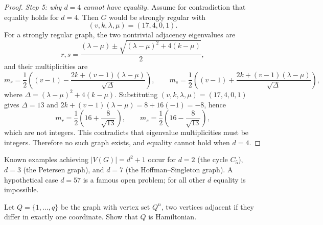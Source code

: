 \documentclass[11pt, a4paper]{ctexrep}
\begin{document}
\begin{proof}
    \noindent\emph{Step 5: why $d=4$ cannot have equality.}
    Assume for contradiction that equality holds for $d=4$. Then $G$ would be strongly regular with
    \[
        (v,k,\lambda,\mu)=(17,4,0,1).
    \]
    For a strongly regular graph, the two nontrivial adjacency eigenvalues are
    \[
        r,s=\frac{(\lambda-\mu)\pm\sqrt{(\lambda-\mu)^{2}+4(k-\mu)}}{2},
    \]
    and their multiplicities are
    \[
        m_r=\frac12\left((v-1)-\frac{2k+(v-1)(\lambda-\mu)}{\sqrt{\Delta}}\right),\qquad
        m_s=\frac12\left((v-1)+\frac{2k+(v-1)(\lambda-\mu)}{\sqrt{\Delta}}\right),
    \]
    where $\Delta=(\lambda-\mu)^{2}+4(k-\mu)$.
    Substituting $(v,k,\lambda,\mu)=(17,4,0,1)$ gives $\Delta=13$ and
    $2k+(v-1)(\lambda-\mu)=8+16(-1)=-8$, hence
    \[
        m_r=\frac12\left(16+\frac{8}{\sqrt{13}}\right),\qquad
        m_s=\frac12\left(16-\frac{8}{\sqrt{13}}\right),
    \]
    which are not integers. This contradicts that eigenvalue multiplicities must be integers.
    Therefore no such graph exists, and equality cannot hold when $d=4$.
\end{proof}

\begin{remark}
    Known examples achieving $|V(G)|=d^{2}+1$ occur for $d=2$ (the cycle $C_{5}$),
    $d=3$ (the Petersen graph), and $d=7$ (the Hoffman--Singleton graph). A hypothetical case $d=57$
    is a famous open problem; for all other $d$ equality is impossible.
\end{remark}

\begin{exercise}
    Let $Q=\{1, \ldots, q\}$ be the graph with vertex set $Q^n$, two vertices adjacent if they differ in exactly one coordinate. Show that $Q$ is Hamiltonian.
\end{exercise}
\end{document}
